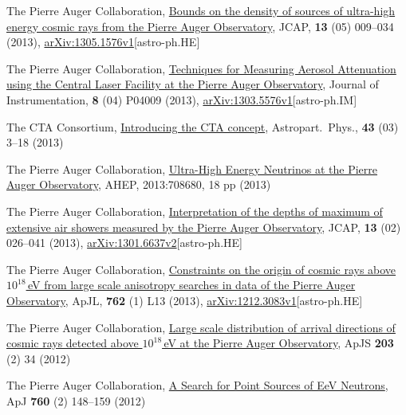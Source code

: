 \begin{etaremune}
\item {}The Pierre Auger Collaboration, \href{http://dx.doi.org/10.1088/1475-7516/2013/05/009}{{Bounds on the density of sources of ultra-high energy cosmic rays from the Pierre Auger Observatory}}, JCAP, {\textbf{13}} (05) 009--034 (2013), \href{http://arxiv.org/abs/1305.1576}{arXiv:1305.1576v1}[astro-ph.HE]

\item {}The Pierre Auger Collaboration, \href{http://dx.doi.org/10.1088/1748-0221/8/04/P04009}{{Techniques for Measuring Aerosol Attenuation using the Central Laser Facility at the Pierre Auger Observatory}}, Journal of Instrumentation, {\textbf{8}} (04) P04009 (2013), \href{http://arxiv.org/abs/1303.5576}{arXiv:1303.5576v1}[astro-ph.IM]

\item {}The CTA Consortium, \href{http://dx.doi.org/10.1016/j.astropartphys.2013.01.007}{{Introducing the CTA concept}}, Astropart.\ Phys., {\textbf{43}} (03) 3--18 (2013)

\item {}The Pierre Auger Collaboration, \href{http://dx.doi.org/10.1155/2013/708680
}{{Ultra-High Energy Neutrinos at the Pierre Auger Observatory}}, AHEP, 2013:708680, 18 pp (2013)

\item {}The Pierre Auger Collaboration, \href{http://dx.doi.org/10.1088/1475-7516/2013/02/026}{{Interpretation of the depths of maximum of extensive air showers measured by the Pierre Auger Observatory}}, JCAP, {\textbf{13}} (02) 026--041 (2013), \href{http://arxiv.org/abs/1301.6637}{arXiv:1301.6637v2}[astro-ph.HE]

\item {}The Pierre Auger Collaboration, \href{http://dx.doi.org/10.1088/2041-8205/762/1/L13}{{Constraints on the origin of cosmic rays above $10^{18}$\,eV from large scale anisotropy searches in data of the Pierre Auger Observatory}}, ApJL, {\textbf{762}} (1) L13 (2013), \href{http://arxiv.org/abs/1212.3083}{arXiv:1212.3083v1}[astro-ph.HE]

\item {}The Pierre Auger Collaboration,
\href{http://dx.doi.org/10.1088/0067-0049/203/2/34}{{Large scale
distribution of arrival directions of cosmic rays detected above $10^{18}$\,eV
at the Pierre Auger Observatory}}, ApJS {\textbf{203}} (2) 34 (2012)

\item {}The Pierre Auger Collaboration,
\href{http://dx.doi.org/10.1088/0004-637X/760/2/148}{{A Search for Point
Sources of EeV Neutrons}}, ApJ {\textbf{760}} (2) 148--159 (2012)


\end{etaremune}
